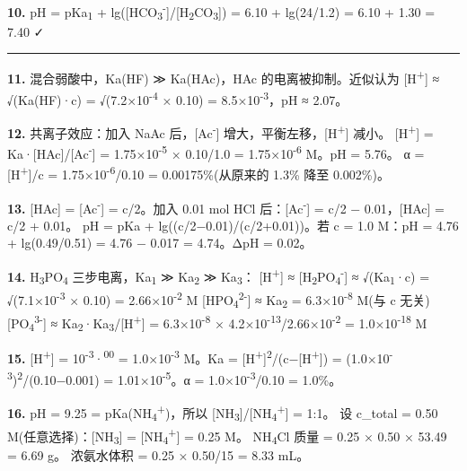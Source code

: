 \textbf{10.} pH = pKa\textsubscript{1} + lg({[}HCO\textsubscript{3}\textsuperscript{-}{]}/{[}H\textsubscript{2}CO\textsubscript{3}{]}) = 6.10 + lg(24/1.2) = 6.10 + 1.30 = 7.40 ✓

\begin{center}\rule{0.5\linewidth}{0.5pt}\end{center}

\textbf{11.} 混合弱酸中，Ka(HF) ≫ Ka(HAc)，HAc 的电离被抑制。近似认为 {[}H\textsuperscript{+}{]} ≈ √(Ka(HF)·c) = √(7.2×10\textsuperscript{-4} × 0.10) = 8.5×10\textsuperscript{-3}，pH ≈ 2.07。

\textbf{12.} 共离子效应：加入 NaAc 后，{[}Ac\textsuperscript{-}{]} 增大，平衡左移，{[}H\textsuperscript{+}{]} 减小。
{[}H\textsuperscript{+}{]} = Ka·{[}HAc{]}/{[}Ac\textsuperscript{-}{]} = 1.75×10\textsuperscript{-5} × 0.10/1.0 = 1.75×10\textsuperscript{-6} M。pH = 5.76。
α = {[}H\textsuperscript{+}{]}/c = 1.75×10\textsuperscript{-6}/0.10 = 0.00175\%(从原来的 1.3\% 降至 0.002\%)。

\textbf{13.} {[}HAc{]} = {[}Ac\textsuperscript{-}{]} = c/2。加入 0.01 mol HCl 后：{[}Ac\textsuperscript{-}{]} = c/2 − 0.01，{[}HAc{]} = c/2 + 0.01。
pH = pKa + lg((c/2−0.01)/(c/2+0.01))。若 c = 1.0 M：pH = 4.76 + lg(0.49/0.51) = 4.76 − 0.017 = 4.74。ΔpH = 0.02。

\textbf{14.} H\textsubscript{3}PO\textsubscript{4} 三步电离，Ka\textsubscript{1} ≫ Ka\textsubscript{2} ≫ Ka\textsubscript{3}：
{[}H\textsuperscript{+}{]} ≈ {[}H\textsubscript{2}PO\textsubscript{4}\textsuperscript{-}{]} ≈ √(Ka\textsubscript{1}·c) = √(7.1×10\textsuperscript{-3} × 0.10) = 2.66×10\textsuperscript{-2} M
{[}HPO\textsubscript{4}\textsuperscript{2-}{]} ≈ Ka\textsubscript{2} = 6.3×10\textsuperscript{-8} M(与 c 无关)
{[}PO\textsubscript{4}\textsuperscript{3-}{]} ≈ Ka\textsubscript{2}·Ka\textsubscript{3}/{[}H\textsuperscript{+}{]} = 6.3×10\textsuperscript{-8} × 4.2×10\textsuperscript{-13}/2.66×10\textsuperscript{-2} = 1.0×10\textsuperscript{-18} M

\textbf{15.} {[}H\textsuperscript{+}{]} = 10\textsuperscript{-3}·\textsuperscript{00} = 1.0×10\textsuperscript{-3} M。Ka = {[}H\textsuperscript{+}{]}\textsuperscript{2}/(c−{[}H\textsuperscript{+}{]}) = (1.0×10\textsuperscript{-3})\textsuperscript{2}/(0.10−0.001) = 1.01×10\textsuperscript{-5}。α = 1.0×10\textsuperscript{-3}/0.10 = 1.0\%。

\textbf{16.} pH = 9.25 = pKa(NH\textsubscript{4}\textsuperscript{+})，所以 {[}NH\textsubscript{3}{]}/{[}NH\textsubscript{4}\textsuperscript{+}{]} = 1:1。
设 c\_total = 0.50 M(任意选择)：{[}NH\textsubscript{3}{]} = {[}NH\textsubscript{4}\textsuperscript{+}{]} = 0.25 M。
NH\textsubscript{4}Cl 质量 = 0.25 × 0.50 × 53.49 = 6.69 g。
浓氨水体积 = 0.25 × 0.50/15 = 8.33 mL。

